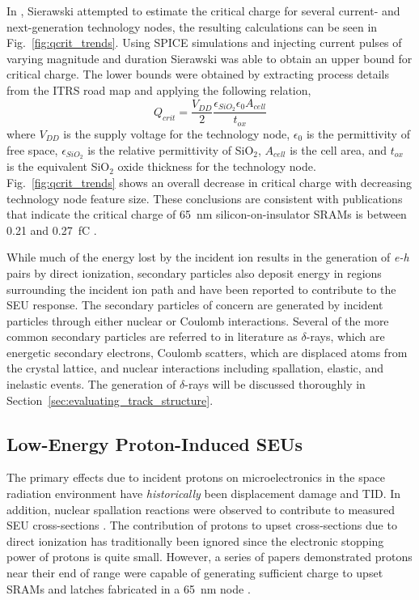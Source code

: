 In \cite{Sierawski:2011tc}, Sierawski attempted to estimate the critical charge for several current- and next-generation technology nodes, the resulting calculations can be seen in Fig.~\ref{fig:qcrit_trends}.
Using SPICE simulations and injecting current pulses of varying magnitude and duration Sierawski was able to obtain an upper bound for critical charge.
The lower bounds were obtained by extracting process details from the ITRS road map \cite{itrs:2012} and applying the following relation,
\begin{equation}
    \label{eq:qcrit}
    Q_{crit} = \frac{V_{DD}}{2}\frac{\epsilon_{SiO_2} \epsilon_0 A_{cell}}{t_{ox}}
\end{equation}
where $V_{DD}$ is the supply voltage for the technology node, $\epsilon_{0}$ is the permittivity of free space, $\epsilon_{SiO_2}$ is the relative permittivity of SiO$_2$, $A_{cell}$ is the cell area, and $t_{ox}$ is the equivalent SiO$_2$ oxide thickness for the technology node.
Fig.~\ref{fig:qcrit_trends} shows an overall decrease in critical charge with decreasing technology node feature size.
These conclusions are consistent with publications that indicate the critical charge of 65~nm silicon-on-insulator SRAMs is between 0.21 and 0.27~fC \cite{Rodbell:2007vl}.

While much of the energy lost by the incident ion results in the generation of \emph{e-h} pairs by direct ionization, secondary particles also deposit energy in regions surrounding the incident ion path and have been reported to contribute to the SEU response.
The secondary particles of concern are generated by incident particles through either nuclear or Coulomb interactions.
Several of the more common secondary particles are referred to in literature as $\delta$-rays, which are energetic secondary electrons, Coulomb scatters, which are displaced atoms from the crystal lattice, and nuclear interactions including spallation, elastic, and inelastic events.
The generation of $\delta$-rays will be discussed thoroughly in Section~\ref{sec:evaluating_track_structure}.

\subsection{Low-Energy Proton-Induced SEUs} %
\label{sub:low_energy_proton_induced_seus}
The primary effects due to incident protons on microelectronics in the space radiation environment have \emph{historically} been displacement damage and TID.
In addition, nuclear spallation reactions were observed to contribute to measured SEU cross-sections \cite{Heidel:2008vf}.
The contribution of protons to upset cross-sections due to direct ionization has traditionally been ignored since the electronic stopping power of protons is quite small.
However, a series of papers demonstrated protons near their end of range were capable of generating sufficient charge to upset SRAMs and latches fabricated in a 65~nm node \cite{Heidel:2006tp,Heidel:2008vf,Heidel:2009vx,Rodbell:2007vl,Sierawski:2009ka}.


